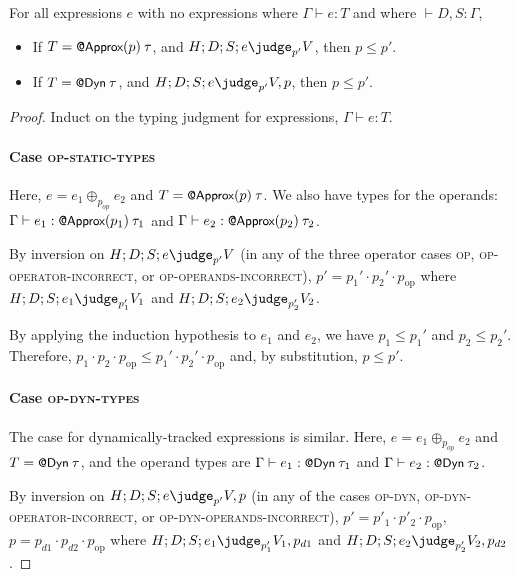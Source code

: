 {\begin{lemma}
For all expressions $e$ with no  expressions
where $\Gamma \vdash e : T$
and where $\vdash D, S : \Gamma$,
\begin{itemize}
\item
If $T = \text{\normalfont{\sffamily\small{@Approx}}}(p) \> \tau$,
and $H ; D ; S ; e \pjudge{p'} V$,
then $p \le p'$.
\item
If $T = \text{\normalfont{\sffamily\small{@Dyn}}} \> \tau$,
and $H ; D ; S ; e \pjudge{p'} V, p$,
then $p \le p'$.
\end{itemize}
\end{lemma}

\begin{proof}
Induct on the typing judgment for expressions, $\Gamma \vdash e : T$.

\paragraph{Case \textsc{op-static-types}}
Here, $e = e_1 \oplus_{p_{op}} e_2$
and $T = \text{\normalfont{\sffamily\small{@Approx}}}(p) \> \tau$.
We also have types for the operands:
$\Gamma \vdash e_1 : \text{\normalfont{\sffamily\small{@Approx}}}(p_1) \> \tau_1$
and
$\Gamma \vdash e_2 : \text{\normalfont{\sffamily\small{@Approx}}}(p_2) \> \tau_2$.

By inversion on $H ; D ; S ; e \pjudge{p'} V$
(in any of the three operator cases \textsc{op}, \textsc{op-operator-incorrect}, or
\textsc{op-operands-incorrect}),
$p' = p_1' \cdot p_2' \cdot p_\text{op}$
where $H ; D ; S ; e_1 \pjudge{p_1'} V_1$
and $H ; D ; S ; e_2 \pjudge{p_2'} V_2$.

By applying the induction hypothesis to $e_1$ and $e_2$, we have
$p_1 \le p_1'$
and
$p_2 \le p_2'$.
Therefore,
$p_1 \cdot p_2 \cdot p_\text{op}
\le
p_1' \cdot p_2' \cdot p_\text{op}$
and, by substitution,
$p \le p'$.

\paragraph{Case \textsc{op-dyn-types}}
The case for dynamically-tracked expressions is similar.
Here, $e = e_1 \oplus_{p_{op}} e_2$ and $T = \text{\normalfont{\sffamily\small{@Dyn}}} \> \tau$,
and the operand types are
$\Gamma \vdash e_1 : \text{\normalfont{\sffamily\small{@Dyn}}} \> \tau_1$ and
$\Gamma \vdash e_2 : \text{\normalfont{\sffamily\small{@Dyn}}} \> \tau_2$.

By inversion on $H ; D ; S ; e \pjudge{p'} V, p$ (in any of the cases
\textsc{op-dyn, op-dyn-operator-incorrect}, or
\textsc{op-dyn-operands-incorrect}), $p' = p'_1 \cdot p'_2 \cdot p_\text{op}$,
$p = p_{d1} \cdot p_{d2} \cdot p_\text{op}$
where $H ; D ; S ; e_1 \pjudge{p'_1} V_1, p_{d1}$ and
$H ; D ; S ; e_2 \pjudge{p'_2} V_2, p_{d2}$.


\end{proof}}
